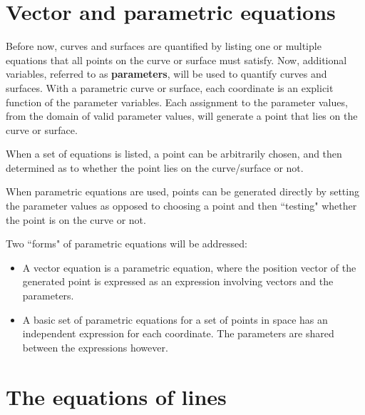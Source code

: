 \documentclass{article}
\begin{document}
\section*{Vector and parametric equations}

Before now, curves and surfaces are quantified by listing one or multiple equations that all points on the curve or surface must satisfy. Now, additional variables, referred to as {\bf parameters}, will be used to quantify curves and surfaces. With a parametric curve or surface, each coordinate is an explicit function of the parameter variables. Each assignment to the parameter values, from the domain of valid parameter values, will generate a point that lies on the curve or surface. 

When a set of equations is listed, a point can be arbitrarily chosen, and then determined as to whether the point lies on the curve/surface or not. 

When parametric equations are used, points can be generated directly by setting the parameter values as opposed to choosing a point and then ``testing" whether the point is on the curve or not.

Two ``forms" of parametric equations will be addressed:
\begin{itemize}
\item A vector equation is a parametric equation, where the position vector of the generated point is expressed as an expression involving vectors and the parameters.
\item A basic set of parametric equations for a set of points in space has an independent expression for each coordinate. The parameters are shared between the expressions however.
\end{itemize}



\section*{The equations of lines}
\end{document}

